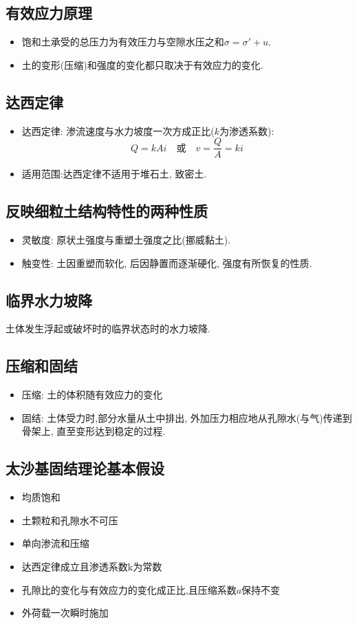 \documentclass[a4paper,titlepage,twocolumn]{article}
\begin{document}
\subsection{有效应力原理}
\begin{itemize}
\item 饱和土承受的总压力为有效压力与空隙水压之和$\sigma = \sigma'+u$.
\item 土的变形(压缩)和强度的变化都只取决于有效应力的变化.
\end{itemize}

\subsection{达西定律}
\begin{itemize}
\item 达西定律: 渗流速度与水力坡度一次方成正比($k$为渗透系数):
\[
Q = kAi\quad \textrm{或}\quad  v=\frac{Q}{A}=ki
\]
\item 适用范围:达西定律不适用于堆石土, 致密土.
\end{itemize}

\subsection{反映细粒土结构特性的两种性质}
\begin{itemize}
\item 灵敏度: 原状土强度与重塑土强度之比(挪威黏土).
\item 触变性: 土因重塑而软化, 后因静置而逐渐硬化, 强度有所恢复的性质.
\end{itemize}


\subsection{临界水力坡降}
土体发生浮起或破坏时的临界状态时的水力坡降.

\subsection{压缩和固结}
\begin{itemize}
\item 压缩: 土的体积随有效应力的变化
\item 固结: 土体受力时,部分水量从土中排出, 外加压力相应地从孔隙水(与气)传递到骨架上, 直至变形达到稳定的过程.
\end{itemize}

\subsection{太沙基固结理论基本假设}
\begin{itemize}
\item 均质饱和
\item 土颗粒和孔隙水不可压
\item 单向渗流和压缩
\item 达西定律成立且渗透系数k为常数
\item 孔隙比的变化与有效应力的变化成正比,且压缩系数$a$保持不变
\item 外荷载一次瞬时施加
\end{itemize}
\end{document}
